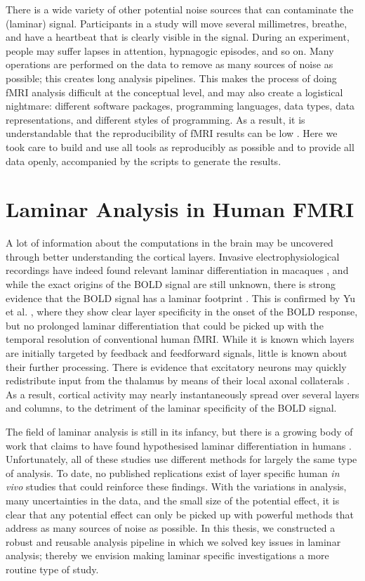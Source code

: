 There is a wide variety of other potential noise sources that can contaminate the (laminar) signal. Participants in a study will move several millimetres, breathe, and have a heartbeat that is clearly visible in the signal. During an experiment, people may suffer lapses in attention, hypnagogic episodes, and so on. Many operations are performed on the data to remove as many sources of noise as possible; this creates long analysis pipelines. This makes the process of doing fMRI analysis difficult at the conceptual level, and may also create a logistical nightmare: different software packages, programming languages, data types, data representations, and different styles of programming. As a result, it is understandable that the reproducibility of fMRI results can be low \cite{Nosek2015,Gorgolewski2016a}. Here we took care to build and use all tools as reproducibly as possible and to provide all data openly, accompanied by the scripts to generate the results.

\section*{Laminar Analysis in Human FMRI}
A lot of information about the computations in the brain may be uncovered through better understanding the cortical layers. Invasive electrophysiological recordings have indeed found relevant laminar differentiation in macaques \cite{Buffalo2011,Maier2010,Maier2011,VanKerkoerle2017}, and while the exact origins of the BOLD signal are still unknown, there is strong evidence that the BOLD signal has a laminar footprint \cite{Goense2006}. This is confirmed by Yu et al. \cite{Yu2014}, where they show clear layer specificity in the onset of the BOLD response, but no prolonged laminar differentiation that could be picked up with the temporal resolution of conventional human fMRI. While it is known which layers are initially targeted by feedback and feedforward signals, little is known about their further processing. There is evidence that excitatory neurons may quickly redistribute input from the thalamus by means of their local axonal collaterals \cite{Guy2017,ReyesPuerta2015}. As a result, cortical activity may nearly instantaneously spread over several layers and columns, to the detriment of the laminar specificity of the BOLD signal.

The field of laminar analysis is still in its infancy, but there is a growing body of work that claims to have found hypothesised laminar differentiation in humans \cite{Maass2014,Muckli2015,Scheeringa2016,Kok2016,Huber2017}. Unfortunately, all of these studies use different methods for largely the same type of analysis. To date, no published replications exist of layer specific human \emph{in vivo} studies that could reinforce these findings. With the variations in analysis, many uncertainties in the data, and the small size of the potential effect, it is clear that any potential effect can only be picked up with powerful methods that address as many sources of noise as possible. In this thesis, we constructed a robust and reusable analysis pipeline in which we solved key issues in laminar analysis; thereby we envision making laminar specific investigations a more routine type of study.

